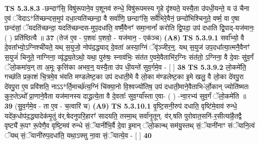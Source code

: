 \documentclass[17pt]{extarticle}
\begin{document}
                  \newline
                                \textbf{ TS 5.3.8.3} \newline
                  -छन्दाꣳ॑सि॒ विषु॑रूपाने॒व प॒शूनव॑ रुन्धे॒ विषु॑रूपमस्य गृ॒हे दृ॑श्यते॒ यस्यै॒ता उ॑पधी॒यन्ते॒ य उ॑ चैना ए॒वं ॅवेदाऽ*ति॑च्छन्दस॒मुप॑ दधा॒त्यति॑च्छन्दा॒ वै सर्वा॑णि॒ छन्दाꣳ॑सि॒ सर्वे॑भिरे॒वैनं॒ छन्दो॑भिश्चिनुते॒ वर्ष्म॒ वा ए॒षा छन्द॑सां॒ ॅयदति॑च्छन्दा॒ यदति॑च्छन्दस-मुप॒दधा॑ति॒ वर्ष्मै॒वैनꣳ॑ समा॒नानां᳚ करोति द्वि॒पदा॒ उप॑ दधाति द्वि॒पाद्-यज॑मानः॒ ( ) प्रति॑ष्ठित्यै ॥ \textbf{  37 } \newline
                  \newline
                      (तेज॑ ए॒व - प॒शवः॑ प॒शवो॒ - यज॑मान॒ - एक॑ञ्च)  \textbf{(A8)} \newline \newline
                                        \textbf{ TS 5.3.9.1} \newline
                  सर्वा᳚भ्यो॒ वै दे॒वता᳚भ्यो॒ऽग्निश्ची॑यते॒ यथ् स॒युजो॒ नोप॑द॒द्ध्याद् दे॒वता॑ अस्या॒ग्निं ॅवृ॑ञ्जीर॒न्॒. यथ् स॒युज॑ उप॒दधा᳚त्या॒त्मनै॒वैनꣳ॑ स॒युजं॑ चिनुते॒ नाग्निना॒ व्यृ॑द्ध्य॒तेऽथो॒ यथा॒ पुरु॑षः॒ स्नाव॑भिः॒ संत॑त ए॒वमे॒वैताभि॑र॒ग्निः संत॑तो॒ ऽग्निना॒ वै दे॒वाः सु॑व॒र्गं ॅलो॒कमा॑य॒न् ता अ॒मूः कृत्ति॑का अभव॒न्॒ यस्यै॒ता उ॑प धी॒यन्ते॑ सुव॒र्गमे॒व - [  ] \textbf{  38} \newline
                  \newline
                                \textbf{ TS 5.3.9.2} \newline
                  लो॒कमे॑ति॒ गच्छ॑ति प्रका॒शं चि॒त्रमे॒व भ॑वति मण्डलेष्ट॒का उप॑ दधाती॒मे वै लो॒का म॑ण्डलेष्ट॒का इ॒मे खलु॒ वै लो॒का दे॑वपु॒रा दे॑वपु॒रा ए॒व प्रवि॑शति॒ नाऽऽ*र्ति॒मार्च्छ॑त्य॒ग्निं चि॑क्या॒नो वि॒श्वज्यो॑तिष॒ उप॑ दधाती॒माने॒वैताभि-॑र्लो॒कान् ज्योति॑ष्मतः कुरु॒तेऽथो᳚ प्रा॒णाने॒वैता यज॑मानस्य दाद्ध्रत्ये॒ता वै दे॒वताः᳚ सुव॒र्ग्या᳚स्ता ए॒वा- ( ) -न्वा॒रभ्य॑ सुव॒र्गं ॅलो॒कमे॑ति ॥ \textbf{  39 } \newline
                  \newline
                      (सु॒व॒र्गमे॒व - ता ए॒व - च॒त्वारि॑ च)  \textbf{(A9)} \newline \newline
                                        \textbf{ TS 5.3.10.1} \newline
                  वृ॒ष्टि॒सनी॒रुप॑ दधाति॒ वृष्टि॑मे॒वाव॑ रुन्धे॒ यदे॑क॒धोप॑द॒द्ध्यादेक॑मृ॒तुं व॑र्.षेदनुपरि॒हारꣳ॑ सादयति॒ तस्मा॒थ् सर्वा॑नृ॒तून्. व॑र्.षति पुरोवात॒सनि॑-र॒सीत्या॑है॒तद्वै वृष्ट्यै॑ रू॒पꣳ रू॒पेणै॒व वृष्टि॒मव॑ रुन्धे सं॒ॅयानी॑भि॒र्वै दे॒वा इ॒मान् ॅलो॒कान्थ् सम॑यु॒स्तथ् सं॒ॅयानी॑नाꣳ संॅयानि॒त्वं ॅयथ् सं॒ॅयानी॑रुप॒दधा॑ति॒ यथा॒ऽफ्सु ना॒वा सं॒ॅयात्ये॒व - [  ] \textbf{  40} \newline
\end{document}
